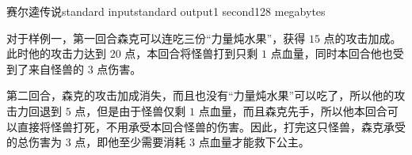 \begin{problem}{赛尔逵传说}{standard input}{standard output}{1 second}{128 megabytes}
    \begin{example}
    \end{example}

    \Explanation

    对于样例一，第一回合森克可以连吃三份“力量炖水果”，获得 $15$ 点的攻击加成。此时他的攻击力达到 $20$ 点，本回合将怪兽打到只剩 $1$ 点血量，同时本回合他也受到了来自怪兽的 $3$ 点伤害。
    
    第二回合，森克的攻击加成消失，而且也没有“力量炖水果”可以吃了，所以他的攻击力回退到 $5$ 点，但是由于怪兽仅剩 $1$ 点血量，而且森克先手，所以他本回合可以直接将怪兽打死，不用承受本回合怪兽的伤害。因此，打完这只怪兽，森克承受的总伤害为 $3$ 点，即他至少需要消耗 $3$ 点血量才能救下公主。

\end{problem}